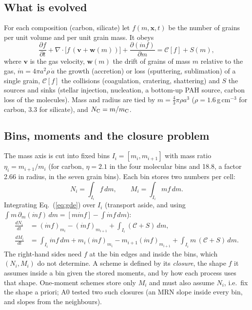 \documentclass[11pt,a4paper]{article}
\newcommand{\NC}{N_{\rm C}}
\begin{document}
\subsection{What is evolved}
For each composition (carbon, silicate) let $f(m,\mathbf x,t)$ be the number of grains per unit volume and per unit
grain mass. It obeys
\begin{equation}\label{eq:gde}
\frac{\partial f}{\partial t} + \nabla\!\cdot\!\big[f\,(\mathbf v + \mathbf w(m))\big]
 + \frac{\partial (\dot m f)}{\partial m} = \mathcal C[f] + S(m),
\end{equation}
where $\mathbf v$ is the gas velocity, $\mathbf w(m)$ the drift of grains of mass $m$ relative to the gas,
$\dot m = 4\pi a^2\rho\,\dot a$ the growth (accretion) or loss (sputtering, sublimation) of a single grain,
$\mathcal C[f]$ the collisions (coagulation, cratering, shattering) and $S$ the sources and sinks (stellar injection,
nucleation, a bottom-up PAH source, carbon loss of the molecules). Mass and radius are tied by
$m = \tfrac43\pi\rho a^3$ ($\rho = 1.6$\,g\,cm$^{-3}$ for carbon, 3.3 for silicate), and $\NC = m/m_{\rm C}$.

\subsection{Bins, moments and the closure problem}
The mass axis is cut into fixed bins $I_i = [m_i, m_{i+1}]$ with mass ratio $\eta_i = m_{i+1}/m_i$ (for carbon,
$\eta = 2.1$ in the four molecular bins and 18.8, a factor 2.66 in radius, in the seven grain bins). Each bin stores
two numbers per cell:
\begin{equation}
N_i = \int_{I_i} f\,dm, \qquad M_i = \int_{I_i} m f\,dm .
\end{equation}
Integrating Eq.~(\ref{eq:gde}) over $I_i$ (transport aside, and using $\int m\,\partial_m(\dot m f)\,dm = [m\dot m f] -
\int \dot m f\,dm$):
\begin{align}
\frac{dN_i}{dt} &= (\dot m f)_{m_i} - (\dot m f)_{m_{i+1}} + \int_{I_i}(\mathcal C + S)\,dm, \label{eq:dN}\\
\frac{dM_i}{dt} &= \int_{I_i}\dot m f\,dm + m_i(\dot m f)_{m_i} - m_{i+1}(\dot m f)_{m_{i+1}}
 + \int_{I_i} m\,(\mathcal C + S)\,dm. \label{eq:dM}
\end{align}
The right-hand sides need $f$ at the bin edges and inside the bins, which $(N_i, M_i)$ do not determine. A scheme is
defined by its \emph{closure}, the shape $f$ it assumes inside a bin given the stored moments, and by how each process
uses that shape. One-moment schemes store only $M_i$ and must also assume $N_i$, i.e.\ fix the shape a priori; A0
tested two such closures (an MRN slope inside every bin, and slopes from the neighbours).
\end{document}
